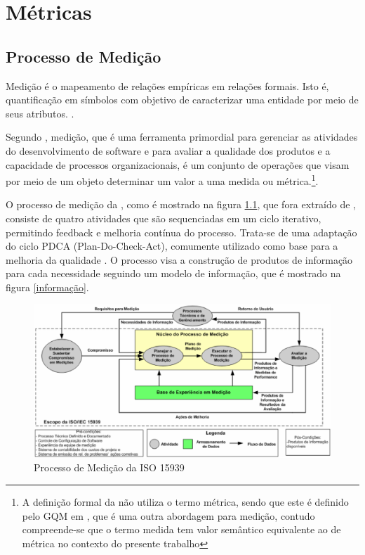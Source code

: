 \chapter{Métricas}

\section{Processo de Medição}

Medição é o mapeamento de relações empíricas em relações formais. Isto é, 
quantificação em símbolos com objetivo de caracterizar uma entidade por meio de 
seus atributos. \cite{Fenton98}.
	
Segundo , medição, que é uma ferramenta primordial para 
gerenciar as atividades do desenvolvimento de software e para avaliar a 
qualidade dos produtos e a capacidade de processos organizacionais, é um 
conjunto de operações que visam por meio de um objeto determinar um valor a uma 
medida ou 
métrica.\footnote{A definição formal da  não utiliza o 
termo métrica, sendo que este é definido pelo GQM em , 
que é uma outra abordagem para medição, contudo compreende-se que o termo medida 
tem valor semântico equivalente ao de métrica no contexto do presente trabalho}. 
	
	
O processo de medição da , como é mostrado na figura 
\ref{processo}, que fora extraído de , consiste de quatro 
atividades que são sequenciadas em um ciclo iterativo, permitindo feedback e 
melhoria contínua do processo. Trata-se de uma adaptação do ciclo 
PDCA (Plan-Do-Check-Act), comumente utilizado como base para a melhoria da 
qualidade \cite{Barcellos2010}.  O processo visa a construção de produtos de 
informação para cada necessidade seguindo um modelo de informação, que é 
mostrado na figura \ref{informação}.
		
\begin{figure}[h]
\centering	
	\includegraphics[keepaspectratio=true,scale=0.55]{figuras/processo15939.eps}
	\caption{Processo de Medição da ISO 15939}
	\label{processo}
\end{figure}
		


